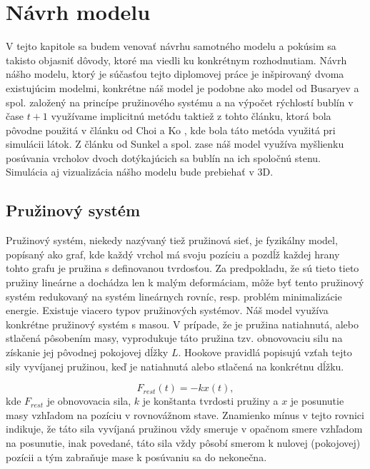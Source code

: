 \chapter{Návrh modelu}\label{chap:proposal}

V tejto kapitole sa budem venovať návrhu samotného modelu a pokúsim sa takisto objasniť dôvody, ktoré ma viedli ku konkrétnym rozhodnutiam. Návrh nášho modelu, ktorý je súčasťou tejto diplomovej práce je inšpirovaný dvoma existujúcim modelmi, konkrétne náš model je podobne ako model od Busaryev a spol. \cite{busaryev2012} založený na princípe pružinového systému a na výpočet rýchlostí bublín v čase $t + 1$ využívame implicitnú metódu taktiež z tohto článku, ktorá bola pôvodne použitá v článku od Choi a Ko \cite{choiko2002}, kde bola táto metóda využitá pri simulácii látok. Z článku od Sunkel a spol. \cite{sunkel2004} zase náš model využíva myšlienku posúvania vrcholov dvoch dotýkajúcich sa bublín na ich spoločnú stenu. Simulácia aj vizualizácia nášho modelu bude prebiehať v 3D.

\section{Pružinový systém}

Pružinový systém, niekedy nazývaný tiež pružinová sieť, je fyzikálny model, popísaný ako graf, kde každý vrchol má svoju pozíciu a pozdĺž každej hrany tohto grafu je pružina s definovanou tvrdosťou. Za predpokladu, že sú tieto tieto pružiny lineárne a dochádza len k malým deformáciam, môže byť tento pružinový systém redukovaný na systém lineárnych rovníc, resp. problém minimalizácie energie. Existuje viacero typov pružinových systémov. Náš model využíva konkrétne pružinový systém s masou. V prípade, že je pružina natiahnutá, alebo stlačená pôsobením masy, vyprodukuje táto pružina tzv. obnovovaciu silu na získanie jej pôvodnej pokojovej dĺžky $L$. Hookove pravidlá popisujú vzťah tejto sily vyvíjanej pružinou, keď je natiahnutá alebo stlačená na konkrétnu dĺžku.

\begin{equation}
	F_{rest} \left( t \right) = -kx \left( t \right),
\end{equation}
kde $F_{rest}$ je obnovovacia sila, $k$ je konštanta tvrdosti pružiny a $x$ je posunutie masy vzhľadom na pozíciu v rovnovážnom stave. Znamienko mínus v tejto rovnici indikuje, že táto sila vyvíjaná pružinou vždy smeruje v opačnom smere vzhľadom na posunutie, inak povedané, táto sila vždy pôsobí smerom k nulovej (pokojovej) pozícii a tým zabraňuje mase k posúvaniu sa do nekonečna.

